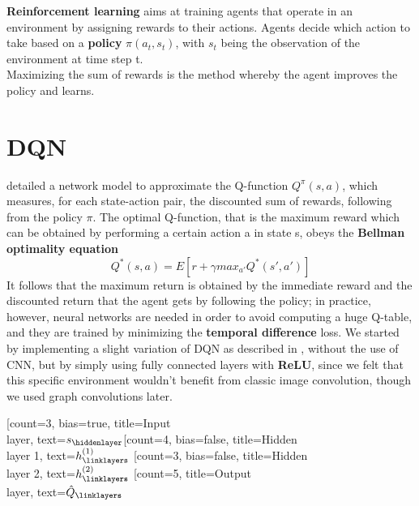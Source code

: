 \textbf{Reinforcement learning} aims at training agents that operate in an environment by assigning rewards to their actions. Agents decide which action to take based on a \textbf{policy} $\pi(a_t, s_t)$, with $s_t$ being the observation of the environment at time step t. \\
Maximizing the sum of rewards is the method whereby the agent improves the policy and learns.

\section{DQN}
\cite{dqn} detailed a network model to approximate the Q-function $Q^{\pi}(s,a)$, which measures, for each state-action pair, the discounted sum of rewards, following from the policy $\pi$. The optimal Q-function, that is the maximum reward which can be obtained by performing a certain action a in state s, obeys the \textbf{Bellman optimality equation} $$Q^*(s,a) = E[r + \gamma max_{a'}Q^*(s', a')]$$
It follows that the maximum return is obtained by the immediate reward and the discounted return that the agent gets by following the policy; in practice, however, neural networks are needed in order to avoid computing a huge Q-table, and they are trained by minimizing the \textbf{temporal difference} loss.  
We started by implementing a slight variation of DQN as described in \cite{dqn}, without the use of CNN, but by simply using fully connected layers with \textbf{ReLU}, since we felt that this specific environment wouldn't benefit from classic image convolution, though we used graph convolutions later. \\
\begin{neuralnetwork} [nodespacing=10mm, layerspacing=25mm,
			maintitleheight=2.5em, layertitleheight=2.5em,
			height=5, toprow=false, nodesize=17pt, style={},
			title={}, titlestyle={}]
		        \newcommand{\x}[2]{$s_#2$}
		        \newcommand{\y}[2]{$\hat{Q}_#2$}
		        \newcommand{\hfirst}[2]{\small $h^{(1)}_#2$}
		        \newcommand{\hsecond}[2]{\small $h^{(2)}_#2$}
		        [count=3, bias=true, title=Input\\layer, text=\x]
		        \hiddenlayer[count=4, bias=false, title=Hidden\\layer 1, text=\hfirst] \linklayers
		        \hiddenlayer[count=3, bias=false, title=Hidden\\layer 2, text=\hsecond] \linklayers
		        \outputlayer[count=5, title=Output\\layer, text=\y] \linklayers
\end{neuralnetwork}

